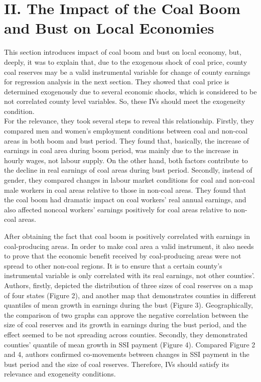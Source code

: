 \documentclass{article} %
\begin{document}
\section{II. The Impact of the Coal Boom and Bust on Local Economies}
This section introduces impact of coal boom and bust on local economy, but, deeply, it was to explain that, due to the exogenous shock of coal price, county coal reserves may be a valid instrumental variable for change of county earnings for regression analysis in the next section. 
They showed that coal price is determined exogenously due to several economic shocks, which is considered to be not correlated county level variables. So, these IVs should meet the exogeneity condition.  \\
For the relevance, they took several steps to reveal this relationship. Firstly, they compared men and women's employment conditions between coal and non-coal areas in both boom and bust period. They found that, basically, the increase of earnings in coal area during boom period, was mainly due to the increase in hourly wages, not labour supply. On the other hand, both factors contribute to the decline in real earnings of coal areas during bust period. Secondly, instead of gender, they compared changes in labour market conditions for coal and non-coal male workers in coal areas relative to those in non-coal areas. They found that the coal boom had dramatic impact on coal workers' real annual earnings, and also affected noncoal workers' earnings positively for coal areas relative to non-coal areas. 

After obtaining the fact that coal boom is positively correlated with earnings in coal-producing areas. In order to make coal area a valid instrument, it also needs to prove that the economic benefit received by coal-producing areas were not spread to other non-coal regions. It is to ensure that a certain county's instrumental variable is only correlated with its real earnings, not other counties'. Authors, firstly, depicted the distribution of three sizes of coal reserves on a map of four states (Figure 2), and another map that demonstrates counties in different quantiles of mean growth in earnings during the bust (Figure 3). Geographically, the comparison of two graphs can approve the negative correlation between the size of coal reserves and its growth in earnings during the bust period, and the effect seemed to be not spreading across counties. Secondly, they demonstrated counties' quantile of mean growth in SSI payment (Figure 4). Compared Figure 2 and 4, authors confirmed co-movements between changes in SSI payment in the bust period and the size of coal reserves. Therefore, IVs should satisfy its relevance and exogeneity conditions. 
\end{document}
